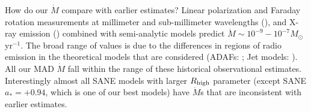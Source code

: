 

How do our $\dot{M}$ compare with earlier estimates?  Linear polarization and Faraday rotation measurements at millimeter and sub-millimeter wavelengths (\citealt{2000ApJ...538L.121A, 2000ApJ...545..842Q, 2003ApJ...588..331B, 2006ApJ...640..308M, 2006JPhCS..54..354M, 2006ApJ...646L.111M}), and X-ray emission (\citealt{2003ApJ...591..891B, doi:10.1126/science.1240755}) combined  with semi-analytic models predict $\dot{M} \sim 10^{-9} - 10^{-7} M_{\odot}$yr$^{-1}$. The broad range of values is due to the differences in regions of radio emission in the theoretical models that are considered (ADAFs: \citealt{1998ApJ...492..554N, Yuan_2003}; Jet models: \citealt{1993A&A...278L...1F, 2000A&A...362..113F}). All our MAD $\dot{M}$ fall within the range of these historical observational estimates. Interestingly almost all SANE models with larger $R_\mathrm{high}$ parameter (except SANE $a_*=+0.94$, which is one of our best models) have $\dot{M}$s that are inconsistent with earlier estimates.



